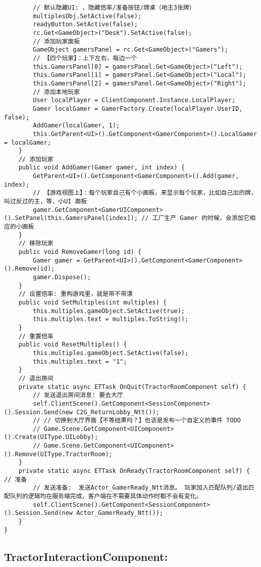 \documentclass[9pt, b5paper]{article}
\begin{document}
\begin{verbatim}
        // 默认隐藏UI: ，隐藏倍率/准备按钮/牌桌（地主3张牌）
        multiplesObj.SetActive(false);
        readyButton.SetActive(false);
        rc.Get<GameObject>("Desk").SetActive(false);
        // 添加玩家面板
        GameObject gamersPanel = rc.Get<GameObject>("Gamers");
        // 【四个玩家】：上下左右，每边一个
        this.GamersPanel[0] = gamersPanel.Get<GameObject>("Left");
        this.GamersPanel[1] = gamersPanel.Get<GameObject>("Local");
        this.GamersPanel[2] = gamersPanel.Get<GameObject>("Right");
        // 添加本地玩家
        User localPlayer = ClientComponent.Instance.LocalPlayer;
        Gamer localGamer = GamerFactory.Create(localPlayer.UserID, false);
        AddGamer(localGamer, 1);
        this.GetParent<UI>().GetComponent<GamerComponent>().LocalGamer = localGamer;
    }
    // 添加玩家
    public void AddGamer(Gamer gamer, int index) {
        GetParent<UI>().GetComponent<GamerComponent>().Add(gamer, index);
        // 【游戏视图上】：每个玩家自己有个小画板，来显示每个玩家，比如自己出的牌，叫过反过的主，等，小UI 面板
        gamer.GetComponent<GamerUIComponent>().SetPanel(this.GamersPanel[index]); // 工厂生产 Gamer 的时候，会添加它相应的小画板
    }
    // 移除玩家
    public void RemoveGamer(long id) {
        Gamer gamer = GetParent<UI>().GetComponent<GamerComponent>().Remove(id);
        gamer.Dispose();
    }
    // 设置倍率: 重构游戏里，就是带不带漂
    public void SetMultiples(int multiples) {
        this.multiples.gameObject.SetActive(true);
        this.multiples.text = multiples.ToString();
    }
    // 重置倍率
    public void ResetMultiples() {
        this.multiples.gameObject.SetActive(false);
        this.multiples.text = "1";
    }
    // 退出房间
    private static async ETTask OnQuit(TractorRoomComponent self) {
        // 发送退出房间消息: 要去大厅
        self.ClientScene().GetComponent<SessionComponent>().Session.Send(new C2G_ReturnLobby_Ntt());
        // // 切换到大厅界面【不等结果吗？】也该是发布一个自定义的事件 TODO
        // Game.Scene.GetComponent<UIComponent>().Create(UIType.UILobby);
        // Game.Scene.GetComponent<UIComponent>().Remove(UIType.TractorRoom);
    }
    private static async ETTask OnReady(TractorRoomComponent self) { // 准备
        // 发送准备:  发送Actor_GamerReady_Ntt消息。 玩家加入匹配队列/退出匹配队列的逻辑均在服务端完成，客户端在不需要具体动作时都不会有变化。
        self.ClientScene().GetComponent<SessionComponent>().Session.Send(new Actor_GamerReady_Ntt());
    }
}
\end{verbatim}
\subsection{TractorInteractionComponent:}
\label{sec-3-6}
\end{document}
